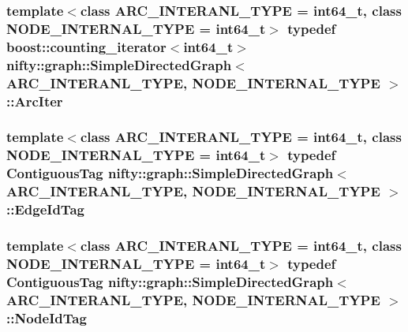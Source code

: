 \subsubsection[{Arc\+Iter}]{\setlength{\rightskip}{0pt plus 5cm}template$<$class A\+R\+C\+\_\+\+I\+N\+T\+E\+R\+A\+N\+L\+\_\+\+T\+Y\+P\+E  = int64\+\_\+t, class N\+O\+D\+E\+\_\+\+I\+N\+T\+E\+R\+N\+A\+L\+\_\+\+T\+Y\+P\+E  = int64\+\_\+t$>$ typedef boost\+::counting\+\_\+iterator$<$int64\+\_\+t$>$ {\bf nifty\+::graph\+::\+Simple\+Directed\+Graph}$<$ A\+R\+C\+\_\+\+I\+N\+T\+E\+R\+A\+N\+L\+\_\+\+T\+Y\+P\+E, N\+O\+D\+E\+\_\+\+I\+N\+T\+E\+R\+N\+A\+L\+\_\+\+T\+Y\+P\+E $>$\+::{\bf Arc\+Iter}}\label{classnifty_1_1graph_1_1SimpleDirectedGraph_ad555ff3a9746915c60858cd7d55ae342}
\hypertarget{classnifty_1_1graph_1_1SimpleDirectedGraph_ad0523e96e29a6feae5c9c003c2dc9e37}{}
\subsubsection[{Edge\+Id\+Tag}]{\setlength{\rightskip}{0pt plus 5cm}template$<$class A\+R\+C\+\_\+\+I\+N\+T\+E\+R\+A\+N\+L\+\_\+\+T\+Y\+P\+E  = int64\+\_\+t, class N\+O\+D\+E\+\_\+\+I\+N\+T\+E\+R\+N\+A\+L\+\_\+\+T\+Y\+P\+E  = int64\+\_\+t$>$ typedef {\bf Contiguous\+Tag} {\bf nifty\+::graph\+::\+Simple\+Directed\+Graph}$<$ A\+R\+C\+\_\+\+I\+N\+T\+E\+R\+A\+N\+L\+\_\+\+T\+Y\+P\+E, N\+O\+D\+E\+\_\+\+I\+N\+T\+E\+R\+N\+A\+L\+\_\+\+T\+Y\+P\+E $>$\+::{\bf Edge\+Id\+Tag}}\label{classnifty_1_1graph_1_1SimpleDirectedGraph_ad0523e96e29a6feae5c9c003c2dc9e37}
\hypertarget{classnifty_1_1graph_1_1SimpleDirectedGraph_a32f9f0f4beaa2cada708f8a51189a96b}{}
\subsubsection[{Node\+Id\+Tag}]{\setlength{\rightskip}{0pt plus 5cm}template$<$class A\+R\+C\+\_\+\+I\+N\+T\+E\+R\+A\+N\+L\+\_\+\+T\+Y\+P\+E  = int64\+\_\+t, class N\+O\+D\+E\+\_\+\+I\+N\+T\+E\+R\+N\+A\+L\+\_\+\+T\+Y\+P\+E  = int64\+\_\+t$>$ typedef {\bf Contiguous\+Tag} {\bf nifty\+::graph\+::\+Simple\+Directed\+Graph}$<$ A\+R\+C\+\_\+\+I\+N\+T\+E\+R\+A\+N\+L\+\_\+\+T\+Y\+P\+E, N\+O\+D\+E\+\_\+\+I\+N\+T\+E\+R\+N\+A\+L\+\_\+\+T\+Y\+P\+E $>$\+::{\bf Node\+Id\+Tag}}\label{classnifty_1_1graph_1_1SimpleDirectedGraph_a32f9f0f4beaa2cada708f8a51189a96b}
\hypertarget{classnifty_1_1graph_1_1SimpleDirectedGraph_a50b05474da6846da32398e01be9e3d30}{}
